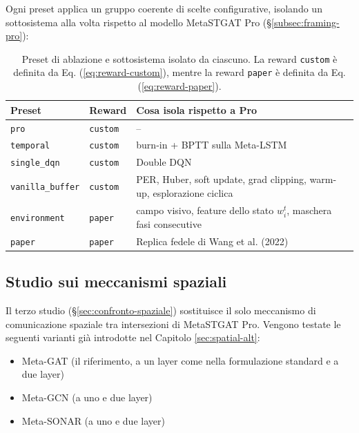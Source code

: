Ogni preset applica un gruppo coerente di scelte configurative,
isolando un sottosistema alla volta rispetto al modello MetaSTGAT Pro (§\ref{subsec:framing-pro}):

\begin{table}[htbp]
  \centering
  \small
  \begin{tabular}{@{}llp{8.5cm}@{}}
    \toprule
    Preset                   & Reward          & Cosa isola rispetto a Pro                                             \\
    \midrule
    \texttt{pro}             & \texttt{custom} & --                                                                    \\
    \texttt{temporal}        & \texttt{custom} & burn-in + BPTT sulla Meta-LSTM                                        \\
    \texttt{single\_dqn}     & \texttt{custom} & Double DQN                                                            \\
    \texttt{vanilla\_buffer} & \texttt{custom} & PER, Huber, soft update, grad clipping, warm-up, esplorazione ciclica \\
    \texttt{environment}     & \texttt{paper}  & campo visivo, feature dello stato $w_i^t$, maschera fasi consecutive  \\
    \texttt{paper}           & \texttt{paper}  & Replica fedele di Wang et al. (2022)                                  \\
    \bottomrule
  \end{tabular}
  \caption{Preset di ablazione e sottosistema isolato da ciascuno. La reward \texttt{custom} è definita da Eq. (\ref{eq:reward-custom}), mentre la reward \texttt{paper} è definita da Eq. (\ref{eq:reward-paper}).}
  \label{tab:ablation-preset}
\end{table}

\subsection{Studio sui meccanismi spaziali}

Il terzo studio (§\ref{sec:confronto-spaziale}) sostituisce il solo
meccanismo di comunicazione spaziale tra intersezioni di MetaSTGAT Pro.
Vengono testate le seguenti varianti già introdotte nel Capitolo \ref{sec:spatial-alt}:
\begin{itemize}
  \item Meta-GAT (il riferimento, a un layer come nella formulazione standard e a due layer)
  \item Meta-GCN (a uno e due layer)
  \item Meta-SONAR (a uno e due layer)
\end{itemize}

